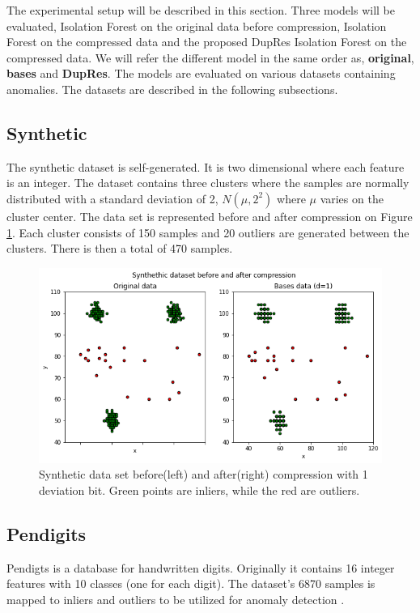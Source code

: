 The experimental setup will be described in this section. Three models will be evaluated, Isolation Forest on the original data before compression, Isolation Forest on the compressed data and the proposed DupRes Isolation Forest on the compressed data. We will refer the different model in the same order as, \textbf{original}, \textbf{bases} and \textbf{DupRes}. The models are evaluated on various datasets containing anomalies. The datasets are described in the following subsections.

\subsection*{Synthetic}
The synthetic dataset is self-generated. It is two dimensional where each feature is an integer. The dataset contains three clusters where the samples are normally distributed with a standard deviation of 2, $N(\mu, 2^2)$ where $\mu$ varies on the cluster center. The data set is represented before and after compression on Figure \ref{fig:synthetic-dataset}. Each cluster consists of 150 samples and 20 outliers are generated between the clusters. There is then a total of 470 samples.

\begin{figure}
  \centering
  \includegraphics[width=\linewidth]{images/synthethic-dataset.png}
  \caption{Synthetic data set before(left) and after(right) compression with 1 deviation bit. Green points are inliers, while the red are outliers. }
  \label{fig:synthetic-dataset}
\end{figure}

\subsection*{Pendigits}
Pendigts is a database for handwritten digits. Originally it contains 16 integer features  with 10 classes (one for each digit). The dataset's 6870 samples is mapped to inliers and outliers to be utilized for anomaly detection \cite{ODDS}.

